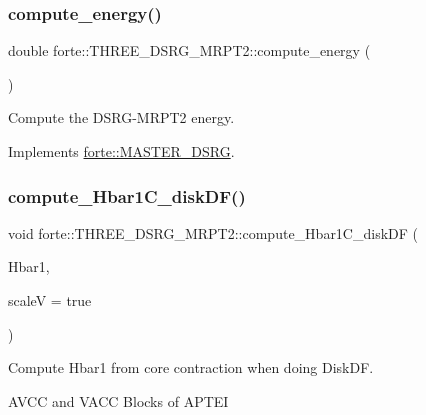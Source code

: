 \subsubsection{\texorpdfstring{compute\+\_\+energy()}{compute\_energy()}}
{\footnotesize\ttfamily double forte\+::\+T\+H\+R\+E\+E\+\_\+\+D\+S\+R\+G\+\_\+\+M\+R\+P\+T2\+::compute\+\_\+energy (\begin{DoxyParamCaption}{ }\end{DoxyParamCaption})\hspace{0.3cm}{\ttfamily [virtual]}}



Compute the D\+S\+R\+G-\/\+M\+R\+P\+T2 energy. 



Implements \mbox{\hyperlink{classforte_1_1_m_a_s_t_e_r___d_s_r_g_a34011aaadcc79224071a4266a095591b}{forte\+::\+M\+A\+S\+T\+E\+R\+\_\+\+D\+S\+RG}}.

\mbox{\label{classforte_1_1_t_h_r_e_e___d_s_r_g___m_r_p_t2_a5956eb7599f5dca20cfe7281f81795b5}} 
\subsubsection{\texorpdfstring{compute\+\_\+\+Hbar1\+C\+\_\+disk\+D\+F()}{compute\_Hbar1C\_diskDF()}}
{\footnotesize\ttfamily void forte\+::\+T\+H\+R\+E\+E\+\_\+\+D\+S\+R\+G\+\_\+\+M\+R\+P\+T2\+::compute\+\_\+\+Hbar1\+C\+\_\+disk\+DF (\begin{DoxyParamCaption}\item[{ambit\+::\+Blocked\+Tensor \&}]{Hbar1,  }\item[{bool}]{scaleV = {\ttfamily true} }\end{DoxyParamCaption})\hspace{0.3cm}{\ttfamily [protected]}}



Compute Hbar1 from core contraction when doing Disk\+DF. 

A\+V\+CC and V\+A\+CC Blocks of A\+P\+T\+EI

